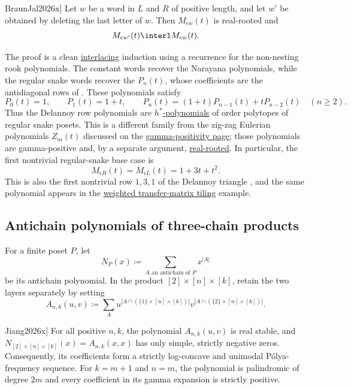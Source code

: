 \begin{theorem}[Braun--Jal \cite[Thm.~4.1]{BraunJal2026x}]
Let \(w\) be a word in \(L\) and \(R\) of positive length, and let \(w'\) be
obtained by deleting the last letter of \(w\).  Then \(M_{\epsilon w}(t)\) is real-rooted
and
\[
  M_{\epsilon w'}(t) \interl M_{\epsilon w}(t).
\]
\end{theorem}

The proof is a clean \hyperref[interlacingPolynomials]{interlacing} induction
using a recurrence for the
non-nesting rook polynomials.  The constant words recover the Narayana
polynomials, while the regular snake words recover the
\label{delannoyRowPolynomials} \(P_n(t)\),
whose coefficients are the antidiagonal rows of .  These
polynomials satisfy
\[
  P_0(t)=1,\qquad P_1(t)=1+t,\qquad
  P_n(t)=(1+t)P_{n-1}(t)+tP_{n-2}(t) \quad (n\geq 2).
\]
Thus the Delannoy row polynomials are
\hyperref[hStarPolynomial]{\(h^*\)-polynomials} of order polytopes
of regular snake posets.  This is a different family from the zig-zag
Eulerian polynomials \(Z_m(t)\) discussed on the
\hyperref[gammaPositivity]{gamma-positivity page}; those polynomials are
gamma-positive and, by a separate argument,
\hyperref[zigZagEulerianRealRooted]{real-rooted}.
In particular, the first nontrivial regular-snake base case is
\[
  M_{\epsilon R}(t)=M_{\epsilon L}(t)=1+3t+t^2.
\]
This is also the first nontrivial row \(1,3,1\) of the Delannoy triangle
, and the same polynomial appears in the
\hyperref[transferMatrixWeightedTilings]{weighted transfer-matrix tiling}
example.

\subsection[antichainBoxStability]{Antichain polynomials of three-chain products}

For a finite poset $P$, let
\[
  N_P(x)\coloneqq
  \sum_{A\text{ an antichain of }P}x^{|A|}
\]
be its antichain polynomial.  In the product
$[2]\times[n]\times[k]$, retain the two layers separately by setting
\[
  A_{n,k}(u,v)
  \coloneqq
  \sum_A u^{|A\cap(\{1\}\times[n]\times[k])|}
  v^{|A\cap(\{2\}\times[n]\times[k])|}.
\]

\begin{theorem}[Jiang, \cite[Thms.~1.1--1.3]{Jiang2026x}]
For all positive $n,k$, the polynomial $A_{n,k}(u,v)$ is real stable, and
$N_{[2]\times[n]\times[k]}(x)=A_{n,k}(x,x)$ has only simple, strictly
negative zeros.  Consequently, its coefficients form a strictly log-concave
and unimodal P{\'o}lya-frequency sequence.  For $k=m+1$ and $n=m$, the
polynomial is palindromic of degree $2m$ and every coefficient in its
gamma expansion is strictly positive.
\end{theorem}

